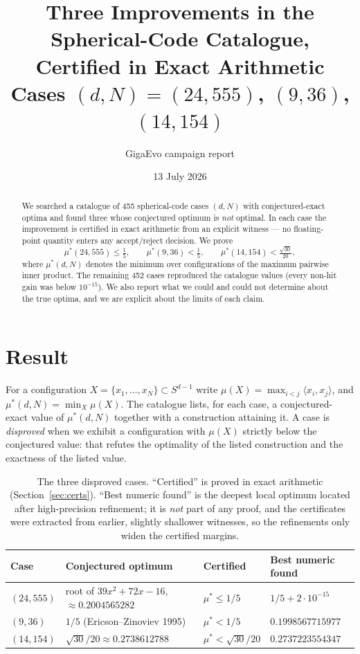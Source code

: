\documentclass[11pt,a4paper]{article}
\title{Three Improvements in the Spherical-Code Catalogue,\\
Certified in Exact Arithmetic\\[0.4em]
\large Cases $(d,N) = (24,555)$, $(9,36)$, $(14,154)$}
\author{GigaEvo campaign report}
\date{13 July 2026}
\newcommand{\mustar}{\mu^{*}}
\begin{document}
\maketitle

\begin{abstract}
\noindent
We searched a catalogue of 455 spherical-code cases $(d,N)$ with conjectured-exact
optima and found three whose conjectured optimum is \emph{not} optimal. In each case
the improvement is certified in exact arithmetic from an explicit witness --- no
floating-point quantity enters any accept/reject decision. We prove
\[
\mustar(24,555)\le \tfrac15,\qquad
\mustar(9,36)<\tfrac15,\qquad
\mustar(14,154)<\tfrac{\sqrt{30}}{20},
\]
where $\mustar(d,N)$ denotes the minimum over configurations of the maximum pairwise
inner product. The remaining 452 cases reproduced the catalogue values (every
non-hit gain was below $10^{-15}$). We also report what we could and could not
determine about the true optima, and we are explicit about the limits of each claim.
\end{abstract}

\section{Result}

For a configuration $X=\{x_1,\dots,x_N\}\subset S^{d-1}$ write
$\mu(X)=\max_{i<j}\langle x_i,x_j\rangle$, and $\mustar(d,N)=\min_X \mu(X)$.
The catalogue lists, for each case, a conjectured-exact value of $\mustar(d,N)$
together with a construction attaining it. A case is \emph{disproved} when we exhibit
a configuration with $\mu(X)$ strictly below the conjectured value: that refutes the
optimality of the listed construction and the exactness of the listed value.

\begin{table}[H]
\centering
\begin{tabular}{llll}
\toprule
Case & Conjectured optimum & Certified & Best numeric found \\
\midrule
$(24,555)$ & root of $39x^2{+}72x{-}16$, $\approx 0.2004565282$ & $\mustar \le 1/5$          & $1/5 + 2\cdot10^{-15}$ \\
$(9,36)$   & $1/5$ (Ericson--Zinoviev 1995)                     & $\mustar < 1/5$            & $0.1998567715977$ \\
$(14,154)$ & $\sqrt{30}/20 \approx 0.2738612788$                & $\mustar < \sqrt{30}/20$   & $0.2737223554347$ \\
\bottomrule
\end{tabular}
\caption{The three disproved cases. ``Certified'' is proved in exact arithmetic
(Section~\ref{sec:certs}). ``Best numeric found'' is the deepest local optimum located
after high-precision refinement; it is \emph{not} part of any proof, and the
certificates were extracted from earlier, slightly shallower witnesses, so the
refinements only widen the certified margins.}
\end{table}
\end{document}
